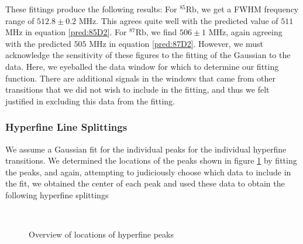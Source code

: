 \documentclass[12pt]{article}
\begin{document}
These fittings produce the following results:  For ${}^{85}\text{Rb}$, we get a FWHM frequency range of $512.8\pm0.2$ MHz.  This agrees quite well with the predicted value of $511$ MHz in equation \ref{pred:85D2}.  For ${}^{87}\text{Rb}$, we find $506\pm1$ MHz, again agreeing with the predicted $505$ MHz in equation \ref{pred:87D2}.  However, we must acknowledge the sensitivity of these figures to the fitting of the Gaussian to the data.  Here, we eyeballed the data window for which to determine our fitting function.  There are additional signals in the windows that came from other transitions that we did not wish to include in the fitting, and thus we felt justified in excluding this data from the fitting.

\subsubsection*{Hyperfine Line Splittings}

We assume a Gaussian fit for the individual peaks for the individual hyperfine transitions.  We determined the locations of the peaks shown in figure \ref{fig:HyperfineOverview} by fitting the peaks, and again, attempting to judiciously choose which data to include in the fit, we obtained the center of each peak and used these data to obtain the following hyperfine splittings

\begin{figure}%
	\centering
	\,
	\caption{Overview of locations of hyperfine peaks}%
	\label{fig:HyperfineOverview}%
\end{figure}
\end{document}
